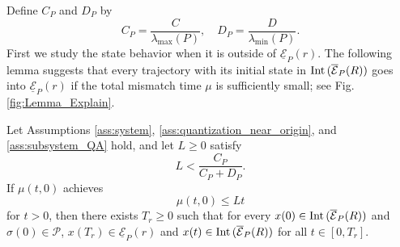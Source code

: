 \documentclass[a4, 11pt]{article}
\newcommand{\Int}{\mathop{\rm Int~\!}}
\begin{document}
Define $C_P$ and $D_P$ by
\begin{equation*}
C_P = \frac{C}{\lambda_{\max}(P)}, \quad
D_P = \frac{D}{\lambda_{\min}(P)}.
\end{equation*} 
First we study the state behavior when it is outside of
$\underline{\mathcal{E}}_P(r)$.
The following lemma suggests that every trajectory with its initial state in
$\Int(\overline{\mathcal{E}}_P(R))$ goes into $\underline{\mathcal{E}}_P(r)$
if the total mismatch time $\mu$ is sufficiently small; see Fig. \ref{fig:Lemma_Explain}.
\begin{lemma}
\label{lem:tor0}
Let Assumptions \ref{ass:system}, \ref{ass:quantization_near_origin}, and
\ref{ass:subsystem_QA}
hold, and let
$L \geq 0$ satisfy
\begin{equation}
\label{eq:L_inequality1}
L < \frac{C_P}{C_P + D_P}.
\end{equation}
If $\mu(t,0)$ achieves 
\begin{equation}
\label{eq:mu_inequality1}
\mu(t,0) \leq Lt
\end{equation}
for $t > 0$, then 
there exists $T_{r} \geq 0$ such that for every
$x(0) \in \Int(\overline{\mathcal{E}}_P(R))$
and $\sigma(0) \in \mathcal{P}$,
$x(T_{r}) \in \underline{\mathcal{E}}_P(r)$ and
$x (t) \in \Int (\overline{\mathcal{E}}_P(R))$ for all $t \in [0, T_{r}]$.
\end{lemma}
\end{document}

